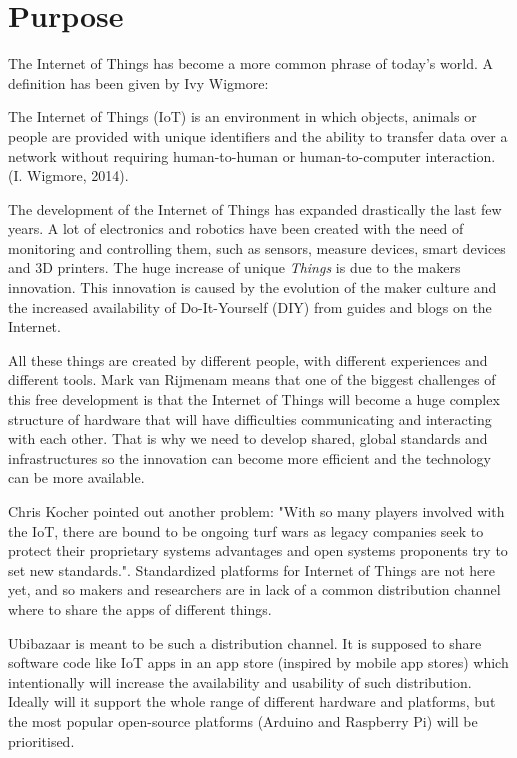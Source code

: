 \section{Purpose}

The Internet of Things has become a more common phrase of today's world. A definition has been given by Ivy Wigmore:

The Internet of Things (IoT) is an environment in which objects, animals or people are provided with unique identifiers and the ability to transfer data over a network without requiring human-to-human or human-to-computer interaction. (I. Wigmore, 2014).\cite{iotdefinition}

The development of the Internet of Things has expanded drastically the last few years. A lot of electronics and robotics have been created with the need of monitoring and controlling them, such as sensors, measure devices, smart devices and 3D printers. The huge increase of unique \textit{Things} is due to the makers innovation. This innovation is caused by the evolution of the maker culture and the increased availability of Do-It-Yourself (DIY) from guides and blogs on the Internet.

All these things are created by different people, with different experiences and different tools. Mark van Rijmenam means that one of the biggest challenges of this free development is that the Internet of Things will become a huge complex structure of hardware that will have difficulties communicating and interacting with each other.\cite{standardChallenge} That is why we need to develop shared, global standards and infrastructures so the innovation can become more efficient and the technology can be more available.

Chris Kocher pointed out another problem: "With so many players involved with the IoT, there are bound to be ongoing turf wars as legacy companies seek to protect their proprietary systems advantages and open systems proponents try to set new standards.".\cite{standardChallenge2} Standardized platforms for Internet of Things are not here yet, and so makers and researchers are in lack of a common distribution channel where to share the apps of different things.

Ubibazaar is meant to be such a distribution channel. It is supposed to share software code like IoT apps in an app store (inspired by mobile app stores) which intentionally will increase the availability and usability of such distribution. Ideally will it support the whole range of different hardware and platforms, but the most popular open-source platforms (Arduino and Raspberry Pi) will be prioritised.

